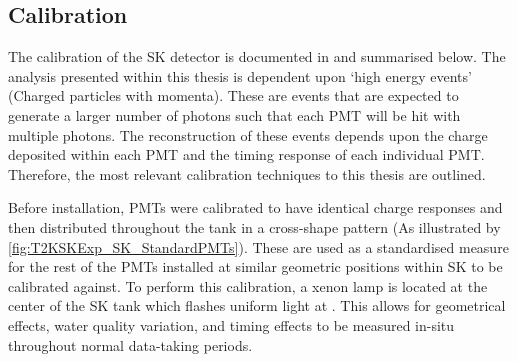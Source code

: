 \subsection{Calibration}
\label{subsec:T2KSKExp_SKCalibration}

The calibration of the SK detector is documented in \cite{Abe_2014_SKCalib} and summarised below. The analysis presented within this thesis is dependent upon `high energy events' (Charged particles with  momenta). These are events that are expected to generate a larger number of photons such that each PMT will be hit with multiple photons. The reconstruction of these events depends upon the charge deposited within each PMT and the timing response of each individual PMT. Therefore, the most relevant calibration techniques to this thesis are outlined.

Before installation,  PMTs were calibrated to have identical charge responses and then distributed throughout the tank in a cross-shape pattern (As illustrated by \autoref{fig:T2KSKExp_SK_StandardPMTs}). These are used as a standardised measure for the rest of the PMTs installed at similar geometric positions within SK to be calibrated against.
To perform this calibration, a xenon lamp is located at the center of the SK tank which flashes uniform light at . This allows for geometrical effects, water quality variation, and timing effects to be measured in-situ throughout normal data-taking periods.

